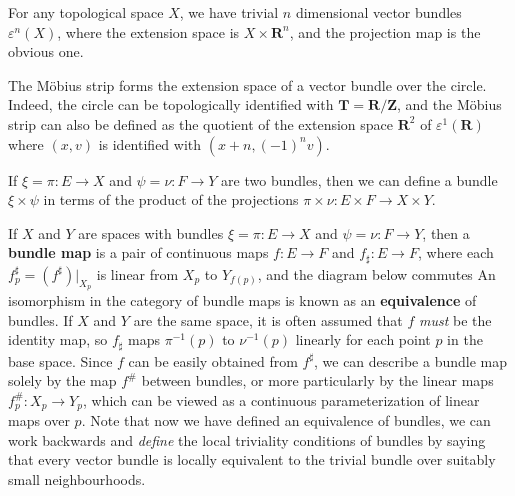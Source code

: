 \begin{example}
    For any topological space $X$, we have trivial $n$ dimensional vector bundles $\varepsilon^n(X)$, where the extension space is $X \times \mathbf{R}^n$, and the projection map is the obvious one.
\end{example}

\begin{example}
    The M\"{o}bius strip forms the extension space of a vector bundle over the circle. Indeed, the circle can be topologically identified with $\mathbf{T} = \mathbf{R}/\mathbf{Z}$, and the M\"{o}bius strip can also be defined as the quotient of the extension space $\mathbf{R}^2$ of $\varepsilon^1(\mathbf{R})$ where $(x,v)$ is identified with $(x + n, (-1)^n v)$.
\end{example}

\begin{example}
    If $\xi = \pi: E \to X$ and $\psi = \nu: F \to Y$ are two bundles, then we can define a bundle $\xi \times \psi$ in terms of the product of the projections $\pi \times \nu: E \times F \to X \times Y$.
\end{example}

If $X$ and $Y$ are spaces with bundles $\xi = \pi: E \to X$ and $\psi = \nu: F \to Y$, then a {\bf bundle map} is a pair of continuous maps $f: E \to F$ and $f_\sharp: E \to F$, where each $f^\sharp_p = (f^\sharp)|_{X_p}$ is linear from $X_p$ to $Y_{f(p)}$, and the diagram below commutes
%
%
An isomorphism in the category of bundle maps is known as an {\bf equivalence} of bundles. If $X$ and $Y$ are the same space, it is often assumed that $f$ {\it must} be the identity map, so $f_\sharp$ maps $\pi^{-1}(p)$ to $\nu^{-1}(p)$ linearly for each point $p$ in the base space. Since $f$ can be easily obtained from $f^\sharp$, we can describe a bundle map solely by the map $f^\#$ between bundles, or more particularly by the linear maps $f^\#_p: X_p \to Y_p$, which can be viewed as a continuous parameterization of linear maps over $p$. Note that now we have defined an equivalence of bundles, we can work backwards and {\it define} the local triviality conditions of bundles by saying that every vector bundle is locally equivalent to the trivial bundle over suitably small neighbourhoods.

